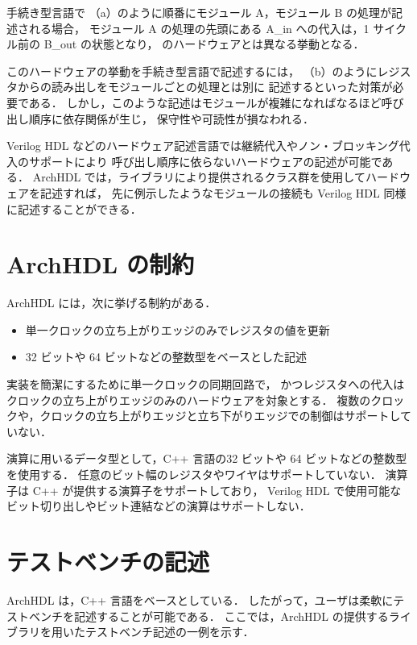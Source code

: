 手続き型言語で
（a）のように順番にモジュール A，モジュール B の処理が記述される場合，
モジュール A の処理の先頭にある A\_in への代入は，1 サイクル前の B\_out の状態となり，
のハードウェアとは異なる挙動となる．

このハードウェアの挙動を手続き型言語で記述するには，
（b）のようにレジスタからの読み出しをモジュールごとの処理とは別に
記述するといった対策が必要である．
しかし，このような記述はモジュールが複雑になればなるほど呼び出し順序に依存関係が生じ，
保守性や可読性が損なわれる．

Verilog HDL などのハードウェア記述言語では継続代入やノン・ブロッキング代入のサポートにより
呼び出し順序に依らないハードウェアの記述が可能である．
ArchHDL では，ライブラリにより提供されるクラス群を使用してハードウェアを記述すれば，
先に例示したようなモジュールの接続も Verilog HDL 同様に記述することができる．


\section{ArchHDL の制約}

ArchHDL には，次に挙げる制約がある．

\begin{itemize}
 \item 単一クロックの立ち上がりエッジのみでレジスタの値を更新
 \item 32 ビットや 64 ビットなどの整数型をベースとした記述
\end{itemize}

実装を簡潔にするために単一クロックの同期回路で，
かつレジスタへの代入はクロックの立ち上がりエッジのみのハードウェアを対象とする．
複数のクロックや，クロックの立ち上がりエッジと立ち下がりエッジでの制御はサポートしていない．

演算に用いるデータ型として，C++ 言語の32 ビットや 64 ビットなどの整数型を使用する．
任意のビット幅のレジスタやワイヤはサポートしていない．
演算子は C++ が提供する演算子をサポートしており，
Verilog HDL で使用可能なビット切り出しやビット連結などの演算はサポートしない．


\section{テストベンチの記述}

ArchHDL は，C++ 言語をベースとしている．
したがって，ユーザは柔軟にテストベンチを記述することが可能である．
ここでは，ArchHDL の提供するライブラリを用いたテストベンチ記述の一例を示す．

